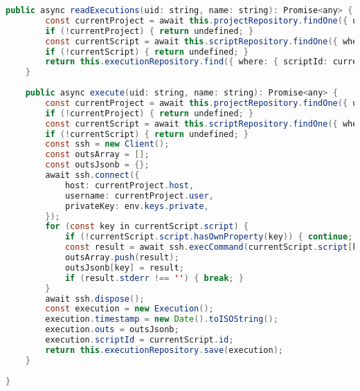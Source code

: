 \begin{lstlisting}[language=java]
	public async readExecutions(uid: string, name: string): Promise<any> {
		const currentProject = await this.projectRepository.findOne({ uid });
		if (!currentProject) { return undefined; }
		const currentScript = await this.scriptRepository.findOne({ where: { projectId: currentProject.uid, name } });
		if (!currentScript) { return undefined; }
		return this.executionRepository.find({ where: { scriptId: currentScript.id } });
	}
	
	public async execute(uid: string, name: string): Promise<any> {
		const currentProject = await this.projectRepository.findOne({ uid });
		if (!currentProject) { return undefined; }
		const currentScript = await this.scriptRepository.findOne({ where: { projectId: currentProject.uid, name } });
		if (!currentScript) { return undefined; }
		const ssh = new Client();
		const outsArray = [];
		const outsJsonb = {};
		await ssh.connect({
			host: currentProject.host,
			username: currentProject.user,
			privateKey: env.keys.private,
		});
		for (const key in currentScript.script) {
			if (!currentScript.script.hasOwnProperty(key)) { continue; }
			const result = await ssh.execCommand(currentScript.script[key], { cwd: currentProject.cwd });
			outsArray.push(result);
			outsJsonb[key] = result;
			if (result.stderr !== '') { break; }
		}
		await ssh.dispose();
		const execution = new Execution();
		execution.timestamp = new Date().toISOString();
		execution.outs = outsJsonb;
		execution.scriptId = currentScript.id;
		return this.executionRepository.save(execution);
	}
	
}
\end{lstlisting}


